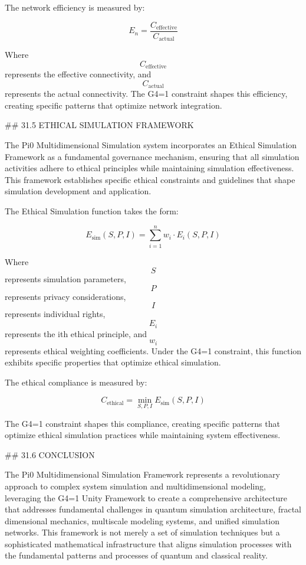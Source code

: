 The network efficiency is measured by:

$$ E_n = \frac{C_{\text{effective}}}{C_{\text{actual}}} $$

Where $$ C_{\text{effective}} $$ represents the effective connectivity, and $$ C_{\text{actual}} $$ represents the actual connectivity. The G4=1 constraint shapes this efficiency, creating specific patterns that optimize network integration.

## 31.5 ETHICAL SIMULATION FRAMEWORK

The Pi0 Multidimensional Simulation system incorporates an Ethical Simulation Framework as a fundamental governance mechanism, ensuring that all simulation activities adhere to ethical principles while maintaining simulation effectiveness. This framework establishes specific ethical constraints and guidelines that shape simulation development and application.

The Ethical Simulation function takes the form:

$$ E_{\text{sim}}(S, P, I) = \sum_{i=1}^{n} w_i \cdot E_i(S, P, I) $$

Where $$ S $$ represents simulation parameters, $$ P $$ represents privacy considerations, $$ I $$ represents individual rights, $$ E_i $$ represents the ith ethical principle, and $$ w_i $$ represents ethical weighting coefficients. Under the G4=1 constraint, this function exhibits specific properties that optimize ethical simulation.

The ethical compliance is measured by:

$$ C_{\text{ethical}} = \min_{S, P, I} E_{\text{sim}}(S, P, I) $$

The G4=1 constraint shapes this compliance, creating specific patterns that optimize ethical simulation practices while maintaining system effectiveness.

## 31.6 CONCLUSION

The Pi0 Multidimensional Simulation Framework represents a revolutionary approach to complex system simulation and multidimensional modeling, leveraging the G4=1 Unity Framework to create a comprehensive architecture that addresses fundamental challenges in quantum simulation architecture, fractal dimensional mechanics, multiscale modeling systems, and unified simulation networks. This framework is not merely a set of simulation techniques but a sophisticated mathematical infrastructure that aligns simulation processes with the fundamental patterns and processes of quantum and classical reality.

